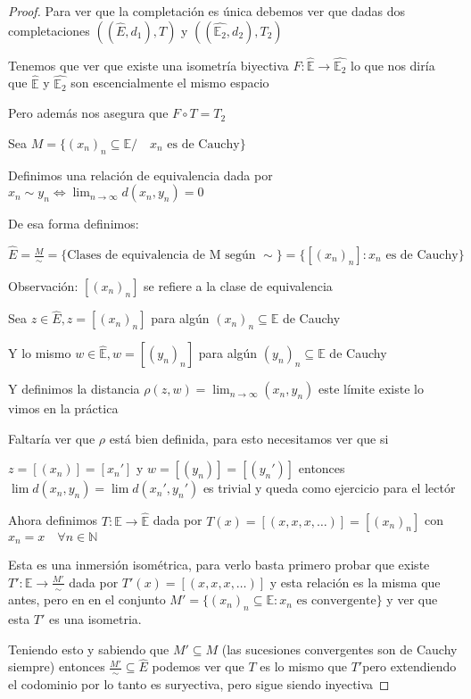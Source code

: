 \documentclass[12pt]{article}
\newcommand{\E}{\mathbb{E}}
\newcommand{\N}{\mathbb{N}}
\newcommand{\ra}{\rightarrow}
\theoremstyle{definition}
\begin{document}
\begin{proof}
  Para ver que la completación es única debemos ver que dadas dos completaciones $((\hat{E},d_1),T)$ y $( (\hat{\E_2}, d_2),T_2 )$ 

  Tenemos que ver que existe una isometría biyectiva $F :\hat{\E} \ra \hat{\E_2}$ lo que nos diría que $\hat{\E}$ y $\hat{\E_2}$ son escencialmente el mismo espacio

  Pero además nos asegura que $F \circ T = T_2$

  Sea $M = \{(x_n)_n \subseteq \E /\quad  x_n \text{ es de Cauchy}\}$

  Definimos una relación de equivalencia dada por $x_n \sim y_n \iff \lim_{n \ra \infty}d(x_n,y_n) = 0$

  De esa forma definimos:

  $\hat{E} = \frac{M}{\sim} = \{\text{Clases de equivalencia de M según } \sim\} = \{[(x_n)_n] : x_n \text{ es de Cauchy}\}$

Observación: $[(x_n)_n]$ se refiere a la clase de equivalencia

Sea $z \in \hat{E}, z = [(x_n)_n ]$ para algún $(x_n)_n \subseteq \E$ de Cauchy

Y lo mismo $w \in \hat{\E}, w = [(y_n)_n ]$ para algún $(y_n)_n \subseteq \E$ de Cauchy

Y definimos la distancia $\rho (z,w) = \lim_{n \ra \infty}(x_n,y_n)$ este límite existe lo vimos en la práctica 

Faltaría ver que $\rho$ está bien definida, para esto necesitamos ver que si 

$z = [(x_n) ] = [x_n']$ y $w = [(y_n) ] = [(y_n')]$ entonces $\lim d(x_n,y_n) = \lim d(x_n',y_n')$ es trivial y queda como ejercicio para el lectór

Ahora definimos $T : \E \ra \hat{\E}$ dada por $T(x) = [(x,x,x, \dots) ] = [(x_n)_n ]$ con $x_n = x \quad \forall n \in \N$

Esta es una inmersión isométrica, para verlo basta primero probar que existe $T' : \E \ra \frac{M'}{\sim}$ dada por $T'(x)= [(x,x,x,\dots) ]$ y esta relación es la misma que antes, pero en en el conjunto $M' = \{(x_n)_n \subseteq \E : x_n \text{ es convergente}\}$ y ver que esta $T'$ es una isometria. 

Teniendo esto y sabiendo que $M' \subseteq M$ (las sucesiones convergentes son de Cauchy siempre) entonces $\frac{M'}{\sim} \subseteq \hat{E}$ podemos ver que $T$ es lo mismo que $T'$pero extendiendo el codominio por lo tanto es suryectiva, pero sigue siendo inyectiva


\end{proof}
\end{document}

